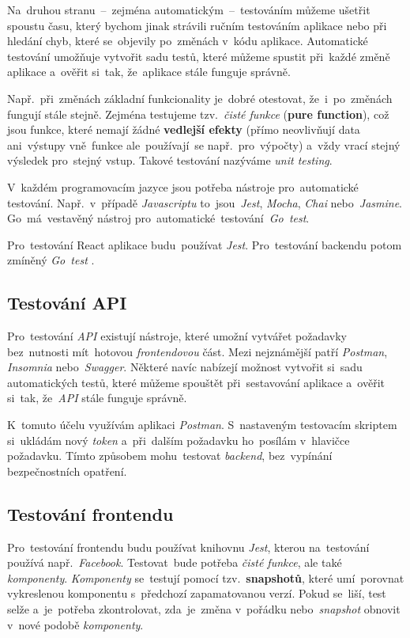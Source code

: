 \documentclass[11pt,a4paper]{report}
\begin{document}
            Na~druhou stranu~--~zejména automatickým~--~testováním můžeme ušetřit spoustu času, který bychom jinak strávili ručním testováním aplikace nebo při hledání chyb, které se~objevily po~změnách v~kódu aplikace. Automatické testování umožňuje vytvořit sadu testů, které můžeme spustit při~každé změně aplikace a~ověřit si~tak, že~aplikace stále funguje správně.
            
            Např.~při~změnách základní funkcionality je~dobré otestovat, že~i~po~změnách fungují stále stejně. Zejména testujeme tzv.~\emph{čisté funkce} (\textbf{pure function}), což jsou funkce, které nemají žádné \textbf{vedlejší efekty} (přímo neovlivňují data ani~výstupy vně~funkce ale~používají~se např.~pro~výpočty) a~vždy vrací stejný výsledek pro~stejný vstup. Takové testování nazýváme \emph{unit testing}.
            
            V~každém programovacím jazyce jsou potřeba nástroje pro~automatické testování. Např.~v~případě \emph{Javascriptu} to~jsou~\emph{Jest}, \emph{Mocha}, \emph{Chai} nebo~\emph{Jasmine}. Go~má~vestavěný nástroj pro~automatické~testování~\emph{Go~test}.
            
            Pro~testování React aplikace budu~používat \emph{Jest}. Pro~testování backendu potom zmíněný \emph{Go~test} \cite{jestjsTestingReact}.
            
            \subsection{Testování API}
                Pro~testování \emph{API} existují nástroje, které umožní vytvářet požadavky bez~nutnosti mít~hotovou \emph{frontendovou} část. Mezi nejznámější patří \emph{Postman}, \emph{Insomnia} nebo~\emph{Swagger}. Některé navíc nabízejí možnost vytvořit si~sadu automatických testů, které můžeme spouštět při~sestavování aplikace a~ověřit si~tak, že~\emph{API} stále funguje správně.

                K~tomuto účelu využívám aplikaci \emph{Postman}. S~nastaveným testovacím skriptem si~ukládám nový \emph{token} a~při~dalším požadavku ho~posílám v~hlavičce požadavku. Tímto způsobem mohu~testovat \emph{backend}, bez~vypínání bezpečnostních opatření.

            \subsection{Testování frontendu}
                Pro~testování frontendu budu používat knihovnu \emph{Jest}, kterou na~testování používá např.~\emph{Facebook}. Testovat~bude potřeba \emph{čisté funkce}, ale také \emph{komponenty}. \emph{Komponenty} se~testují pomocí tzv.~\textbf{snapshotů}, které umí~porovnat vykreslenou komponentu s~předchozí zapamatovanou verzí. Pokud se~liší, test selže a~je~potřeba zkontrolovat, zda~je~změna v~pořádku nebo~\emph{snapshot} obnovit v~nové podobě \emph{komponenty}. \cite{jestjsTestingReact}
\end{document}

